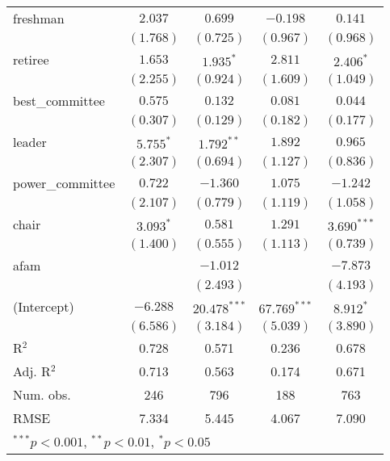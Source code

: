 \documentclass[12pt]{article}
\begin{document}
\begin{table}
\begin{center}
\begin{tabular}{l c c c c }
			freshman               & $2.037$        & $0.699$        & $-0.198$       & $0.141$       \\
			& $(1.768)$      & $(0.725)$      & $(0.967)$      & $(0.968)$     \\
			retiree                & $1.653$        & $1.935^{*}$    & $2.811$        & $2.406^{*}$   \\
			& $(2.255)$      & $(0.924)$      & $(1.609)$      & $(1.049)$     \\
			best\_committee        & $0.575$        & $0.132$        & $0.081$        & $0.044$       \\
			& $(0.307)$      & $(0.129)$      & $(0.182)$      & $(0.177)$     \\
			leader                 & $5.755^{*}$    & $1.792^{**}$   & $1.892$        & $0.965$       \\
			& $(2.307)$      & $(0.694)$      & $(1.127)$      & $(0.836)$     \\
			power\_committee       & $0.722$        & $-1.360$       & $1.075$        & $-1.242$      \\
			& $(2.107)$      & $(0.779)$      & $(1.119)$      & $(1.058)$     \\
			chair                  & $3.093^{*}$    & $0.581$        & $1.291$        & $3.690^{***}$ \\
			& $(1.400)$      & $(0.555)$      & $(1.113)$      & $(0.739)$     \\
			afam                   &                & $-1.012$       &                & $-7.873$      \\
			&                & $(2.493)$      &                & $(4.193)$     \\
			(Intercept)            & $-6.288$       & $20.478^{***}$ & $67.769^{***}$ & $8.912^{*}$   \\
			& $(6.586)$      & $(3.184)$      & $(5.039)$      & $(3.890)$     \\
			\hline
			R$^2$                  & 0.728          & 0.571          & 0.236          & 0.678         \\
			Adj. R$^2$             & 0.713          & 0.563          & 0.174          & 0.671         \\
			Num. obs.              & 246            & 796            & 188            & 763           \\
			RMSE                   & 7.334          & 5.445          & 4.067          & 7.090         \\
			\hline
			\multicolumn{5}{l}{\scriptsize{$^{***}p<0.001$, $^{**}p<0.01$, $^*p<0.05$}}
		\end{tabular}
	\end{center}
\end{table}
\end{document}
